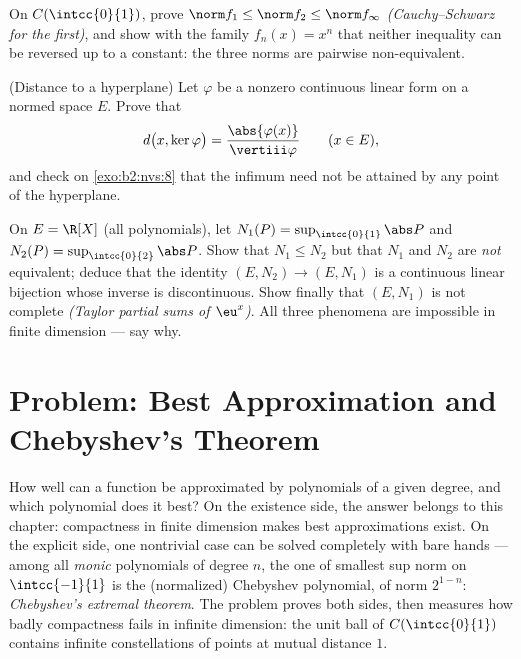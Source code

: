 \begin{exercise}[$\star\star$]\label{exo:b2:nvs:10}
On $C(\intcc{0}{1})$, prove $\norm f_1 \leq \norm f_2 \leq \norm
f_\infty$ \emph{(Cauchy--Schwarz for the first)}, and show with
the family $f_n(x) = x^n$ that neither inequality can be reversed
up to a constant: the three norms are pairwise non-equivalent.
\end{exercise}

\begin{exercise}[$\star\star$]\label{exo:b2:nvs:11}
(Distance to a hyperplane) Let $\varphi$ be a nonzero continuous
linear form on a normed space $E$. Prove that
\[
d\bigl(x, \ker\varphi\bigr) =
\frac{\abs{\varphi(x)}}{\vertiii\varphi}
\qquad (x \in E),
\]
and check on \cref{exo:b2:nvs:8} that the infimum need not be
attained by any point of the hyperplane.
\end{exercise}

\begin{exercise}[$\star\star\star$]\label{exo:b2:nvs:12}
On $E = \R[X]$ (all polynomials), let $N_1(P) =
\sup_{\intcc{0}{1}}\abs P$ and $N_2(P) =
\sup_{\intcc{0}{2}}\abs P$. Show that $N_1 \leq N_2$ but that
$N_1$ and $N_2$ are \emph{not} equivalent; deduce that the
identity $(E, N_2) \to (E, N_1)$ is a continuous linear bijection
whose inverse is discontinuous. Show finally that $(E, N_1)$ is
not complete \emph{(Taylor partial sums of $\eu^x$)}. All three
phenomena are impossible in finite dimension --- say why.
\end{exercise}

\section{Problem: Best Approximation and Chebyshev's Theorem}

How well can a function be approximated by polynomials of a given
degree, and which polynomial does it best? On the existence side,
the answer belongs to this chapter: compactness in finite
dimension makes best approximations exist. On the explicit side,
one nontrivial case can be solved completely with bare hands ---
among all \emph{monic} polynomials of degree $n$, the one of
smallest sup norm on $\intcc{-1}{1}$ is the (normalized) Chebyshev
polynomial, of norm $2^{1-n}$: \emph{Chebyshev's extremal
theorem}. The problem proves both sides, then measures how badly
compactness fails in infinite dimension: the unit ball of
$C(\intcc{0}{1})$ contains infinite constellations of points at
mutual distance $1$.

